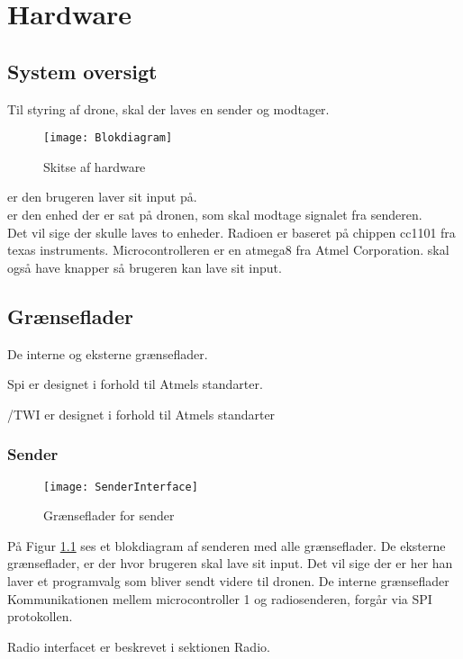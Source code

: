 \documentclass[Main]{subfiles}
\begin{document}
\chapter{Hardware}

\section{System oversigt}

Til styring af drone, skal der laves en sender og modtager.

\begin{figure}[H]
\centering
\texttt{[image: Blokdiagram]}
\caption{Skitse af hardware}
\end{figure}

 er den brugeren laver sit input på. 
\\  er den enhed der er sat på dronen, som skal modtage signalet fra senderen.\\
Det vil sige der skulle laves to enheder. Radioen er baseret på chippen cc1101 fra texas instruments. Microcontrolleren er en atmega8 fra Atmel Corporation.
 skal også have knapper så brugeren kan lave sit input.

\section{Grænseflader}
De interne og eksterne grænseflader. 

Spi er designet i forhold til Atmels standarter. \cite{SPI}

\itoc/TWI er designet i forhold til Atmels standarter \cite{Twi}


\subsection{Sender}
\begin{figure}[H]
\centering
\texttt{[image: SenderInterface]}
\caption{Grænseflader for sender}
\label{fig: SenderInterface}
\end{figure}
På Figur \ref{fig: SenderInterface} ses et blokdiagram af senderen med alle grænseflader.
De eksterne grænseflader, er der hvor brugeren skal lave sit input. Det vil sige der er her han laver et programvalg som bliver sendt videre til dronen.
De interne grænseflader
Kommunikationen mellem microcontroller 1 og radiosenderen, forgår via SPI protokollen. 

Radio interfacet er beskrevet i sektionen Radio.
\end{document}
